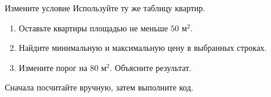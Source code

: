 \begin{frame}{Измените условие}
  Используйте ту же таблицу квартир.
  \begin{enumerate}
    \item Оставьте квартиры площадью не меньше $50$ м$^2$.
    \item Найдите минимальную и максимальную цену в выбранных строках.
    \item Измените порог на $80$ м$^2$. Объясните результат.
  \end{enumerate}
  \medskip
  Сначала посчитайте вручную, затем выполните код.
\end{frame}
